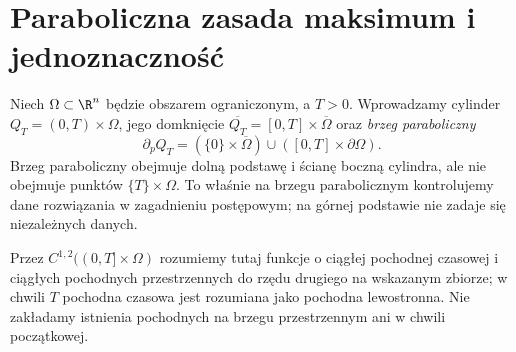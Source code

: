 \section{Paraboliczna zasada maksimum i jednoznaczność}
\label{sec:pde4-maximum}

Niech $\Omega\subset\R^n$ będzie obszarem ograniczonym,
a $T>0$. Wprowadzamy cylinder $Q_T=(0,T)\times\Omega$,
jego domknięcie $\overline{Q_T}=[0,T]\times\overline\Omega$
oraz \emph{brzeg paraboliczny}
\[
 \partial_pQ_T=(\{0\}\times\overline\Omega)
 \cup([0,T]\times\partial\Omega).
\]
Brzeg paraboliczny obejmuje dolną podstawę i ścianę
boczną cylindra, ale nie obejmuje punktów
$\{T\}\times\Omega$. To właśnie na brzegu parabolicznym
kontrolujemy dane rozwiązania w zagadnieniu postępowym;
na górnej podstawie nie zadaje się niezależnych danych.

Przez $C^{1,2}((0,T]\times\Omega)$ rozumiemy tutaj
funkcje o ciągłej pochodnej czasowej i ciągłych
pochodnych przestrzennych do rzędu drugiego
na wskazanym zbiorze; w chwili $T$ pochodna czasowa
jest rozumiana jako pochodna lewostronna.
Nie zakładamy istnienia pochodnych na brzegu
przestrzennym ani w chwili początkowej.


